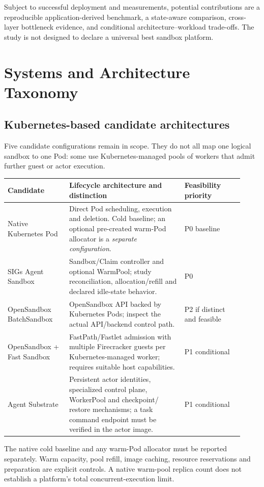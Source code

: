\documentclass[
  a4paper,
]{article}
\begin{document}
Subject to successful deployment and measurements,
potential contributions are a reproducible
application-derived benchmark, a state-aware
comparison, cross-layer bottleneck evidence,
and conditional architecture--workload trade-offs.
The study is not designed to declare a universal
best sandbox platform.

\section{Systems and Architecture Taxonomy}
\label{sec:systems}
\subsection{Kubernetes-based candidate architectures}
Five candidate configurations remain in scope.
They do not all map one logical sandbox to one
Pod: some use Kubernetes-managed pools of
workers that admit further guest or actor execution.

{\small
\begin{longtable}{@{}p{0.24\linewidth}p{0.45\linewidth}p{0.23\linewidth}@{}}
\toprule
Candidate & Lifecycle architecture and distinction & Feasibility priority\\
\midrule
\endhead
\bottomrule
\endlastfoot
Native Kubernetes Pod &
Direct Pod scheduling, execution and deletion.
Cold baseline; an optional pre-created warm-Pod
allocator is a \emph{separate configuration}. &
P0 baseline\\
SIGs Agent Sandbox \cite{sigAgent} &
Sandbox/Claim controller and optional WarmPool;
study reconciliation, allocation/refill and
declared idle-state behavior. &
P0\\
OpenSandbox BatchSandbox \cite{openSandbox} &
OpenSandbox API backed by Kubernetes Pods;
inspect the actual API/backend control path. &
P2 if distinct and feasible\\
OpenSandbox + Fast Sandbox \cite{fastSandbox} &
FastPath/Fastlet admission with multiple
Firecracker guests per Kubernetes-managed
worker; requires suitable host capabilities. &
P1 conditional\\
Agent Substrate \cite{substrate} &
Persistent actor identities, specialized
control plane, WorkerPool and checkpoint/
restore mechanisms; a task command endpoint
must be verified in the actor image. &
P1 conditional\\
\end{longtable}
}

The native cold baseline and any warm-Pod
allocator must be reported separately. Warm
capacity, pool refill, image caching,
resource reservations and preparation are
explicit controls. A native warm-pool
replica count does not establish a
platform's total concurrent-execution limit.
\end{document}
